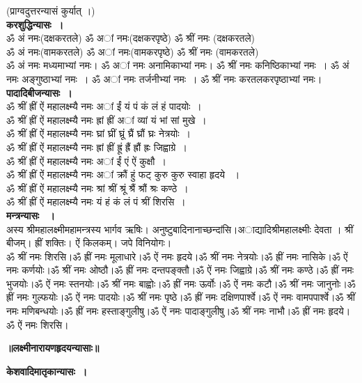 \documentclass[twoside,top=1.7cm, bottom=1.7cm, outer=1cm,landscape, inner=1.5cm,a5paper,]{book}
\begin{document}
(प्राग्वदुत्तरन्यासं कुर्यात् ।)\\
{\bfseries करशुद्धिन्यासः~।}\\
ॐ अं नमः(दक्षकरतले) ॐ अां नमः(दक्षकरपृष्ठे) ॐ श्रीं नमः (दक्षकरतले)\\
ॐ अं नमः(वामकरतले) ॐ अां नमः(वामकरपृष्ठे) ॐ श्रीं नमः (वामकरतले)\\
ॐ अं नमः मध्यमाभ्यां नमः। ॐ अां नमः अनामिकाभ्यां नमः। ॐ श्रीं नमः कनिष्ठिकाभ्यां नमः~।
ॐ अं नमः अङ्गुष्ठाभ्यां नमः~। ॐ अां नमः तर्जनीभ्यां नमः~। ॐ श्रीं नमः करतलकरपृष्ठाभ्यां नमः।\\[10pt]
{\bfseries पादादिबीजन्यासः~।}\\
ॐ श्रीं ह्रीं ऐं महालक्ष्म्यै नमः अां ईं यं पं कं लं हं  पादयोः~।\\
ॐ श्रीं ह्रीं ऐं महालक्ष्म्यै नमः ह्रां ह्रीं अां व्यां यं भां सां मुखे~।\\
ॐ श्रीं ह्रीं ऐं महालक्ष्म्यै नमः घ्रां घ्रीं घ्रूं घ्रैं घ्रौं घ्रः नेत्रयोः~।\\
ॐ श्रीं ह्रीं ऐं महालक्ष्म्यै नमः ह्रां ह्रीं ह्रूं ह्रैं ह्रौं ह्रः जिह्वाग्रे~।\\
ॐ श्रीं ह्रीं ऐं महालक्ष्म्यै नमः अां ईं एं ऐं कुक्षौ~।\\
ॐ श्रीं ह्रीं ऐं महालक्ष्म्यै नमः अां क्रौं हुं फट् कुरु कुरु स्वाहा हृदये ~।\\
ॐ श्रीं ह्रीं ऐं महालक्ष्म्यै नमः श्रां श्रीं श्रूं श्रैं श्रौं श्रः कण्ठे~।\\
ॐ श्रीं ह्रीं ऐं महालक्ष्म्यै नमः यं हं कं लं  पं श्रीं शिरसि~।\\[10pt]
{\bfseries मन्त्रन्यासः ~।}\\
अस्य श्रीमहालक्ष्मीमहामन्त्रस्य भार्गव ऋषिः। अनुष्टुबादिनानाच्छन्दांसि।अाद्यादिश्रीमहालक्ष्मीः देवता । श्रीं बीजम्। ह्रीं शक्तिः। ऐं किलकम्। जपे विनियोगः।\\
ॐ श्रीं नमः शिरसि।ॐ ह्रीं नमः मूलाधारे।ॐ ऐं नमः हृदये।ॐ श्रीं नमः नेत्रयोः।ॐ ह्रीं नमः नासिके।ॐ ऐं नमः कर्णयोः।ॐ श्रीं नमः ओष्ठौ।ॐ ह्रीं नमः दन्तपङ्क्तौ।ॐ ऐं नमः जिह्वाग्रे।ॐ श्रीं नमः कण्ठे।ॐ ह्रीं नमः भुजयोः।ॐ ऐं नमः स्तनयोः।ॐ श्रीं नमः बाह्वोः।ॐ ह्रीं नमः ऊर्वोः।ॐ ऐं नमः कटौ।ॐ श्रीं नमः जानुनोः।ॐ ह्रीं नमः गुल्फयोः।ॐ ऐं नमः पादयोः।ॐ श्रीं नमः पृष्ठे।ॐ ह्रीं नमः दक्षिणपार्श्वे।ॐ ऐं नमः वामपपार्श्वे।ॐ श्रीं नमः मणिबन्धयोः।ॐ ह्रीं नमः हस्ताङ्गुलीषु।ॐ ऐं नमः पादाङ्गुलीषु।ॐ श्रीं नमः नाभौ।ॐ ह्रीं नमः हृदये।ॐ ऐं नमः शिरसि।
\newpage
\begin{center}{\bfseries\LARGE ॥लक्ष्मीनारायणहृदयन्यासाः॥}\end{center}
{\bfseries केशवादिमातृकान्यासः~।}\\
\end{document}
